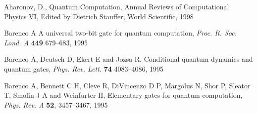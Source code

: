 \documentclass{article}
\begin{document}
\begin{thebibliography}{12}
Aharonov, D., Quantum Computation,
Annual Reviews of Computational Physics VI,
Edited by Dietrich Stauffer, World Scientific, 1998

% 
% 

Barenco A 
A universal two-bit gate for quantum computation,
{\em Proc. R. Soc. Lond. A} {\bf 449} 679--683, 1995




Barenco A, Deutsch D, Ekert E and Jozsa R, 
Conditional quantum dynamics and quantum gates,
{\em Phys. Rev. Lett.} {\bf 74} 4083--4086, 1995


Barenco A, Bennett C H, Cleve R, DiVincenzo D P, Margolus N,
Shor P, Sleator T, Smolin J A and Weinfurter H, 
Elementary gates for quantum computation,
{\em Phys. Rev. A} {\bf 52}, 3457--3467, 1995




% 
% 
% 
% 
% 
% 
% 
% 
% 
% 
% 
% 
% 
% 


\end{thebibliography}
\end{document}
